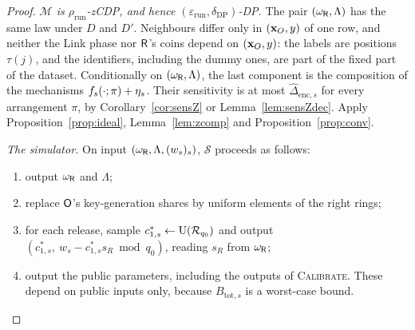 \begin{proof}
\emph{$\mathcal M$ is $\rho_{\mathrm{run}}$-zCDP, and hence $(\varepsilon_{\mathrm{run}},\delta_{\mathrm{DP}})$-DP.} The pair $(\omega_{\mathsf{R}},\Lambda)$ has the same law under $D$ and $D'$. Neighbours differ only in $(\mathbf{x}_O,y)$ of one row, and neither the Link phase nor $\mathsf{R}$'s coins depend on $(\mathbf{x}_O,y)$: the labels are positions $\tau(j)$, and the identifiers, including the dummy ones, are part of the fixed part of the dataset. Conditionally on $(\omega_{\mathsf{R}},\Lambda)$, the last component is the composition of the mechanisms $f_s(\cdot;\pi)+\eta_s$. Their sensitivity is at most $\widehat\Delta_{\mathrm{enc},s}$ for every arrangement $\pi$, by Corollary~\ref{cor:sensZ} or Lemma~\ref{lem:sensZdec}. Apply Proposition~\ref{prop:ideal}, Lemma~\ref{lem:zcomp} and Proposition~\ref{prop:conv}.

\emph{The simulator.} On input $(\omega_{\mathsf{R}},\Lambda,(w_s)_s)$, $\mathcal S$ proceeds as follows:
\begin{enumerate}[nosep]
  \item output $\omega_{\mathsf{R}}$ and $\Lambda$;
  \item replace $\mathsf{O}$'s key-generation shares by uniform elements of the right rings;
  \item for each release, sample $c^*_{1,s}\gets\mathrm{U}(\mathcal{R}_{q_0})$ and output $(c^*_{1,s},\ w_s-c^*_{1,s}s_R\bmod q_0)$, reading $s_R$ from $\omega_{\mathsf{R}}$;
  \item output the public parameters, including the outputs of \textsc{Calibrate}. These depend on public inputs only, because $B_{\mathrm{tot},s}$ is a worst-case bound.
\end{enumerate}


\end{proof}
